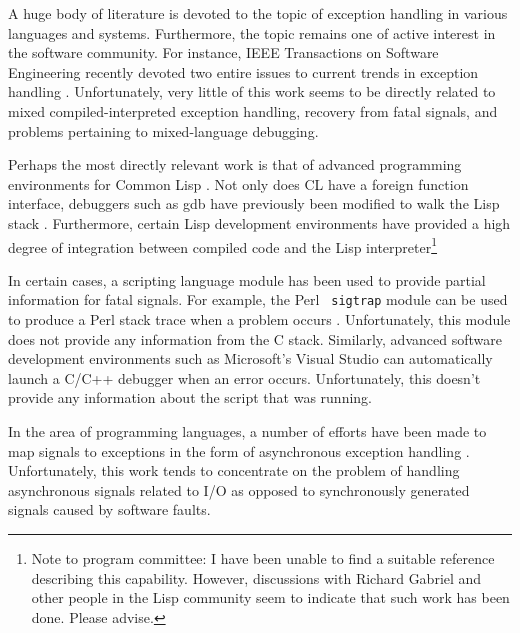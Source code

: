 A huge body of literature is devoted to the topic of exception
handling in various languages and systems.  Furthermore, the topic
remains one of active interest in the software community. For
instance, IEEE Transactions on Software Engineering recently devoted
two entire issues to current trends in exception handling
\cite{except1,except2}.  Unfortunately, very little of this work seems
to be directly related to mixed compiled-interpreted exception
handling, recovery from fatal signals, and problems pertaining to 
mixed-language debugging.

Perhaps the most directly relevant work is that of advanced programming 
environments for Common Lisp \cite{lisp}.  Not only does CL have a foreign function interface,
debuggers such as gdb have previously been modified to walk the Lisp stack
\cite{ffi,wcl}.  Furthermore, certain Lisp development environments have
provided a high degree of integration between compiled code and
the Lisp interpreter\footnote{Note to program committee: I
have been unable to find a suitable reference describing this capability.  However,
discussions with Richard Gabriel and other people in the Lisp community seem to indicate that
such work has been done. Please advise.}

In certain cases, a scripting language module has been used to provide
partial information for fatal signals. For example, the Perl {\tt
sigtrap} module can be used to produce a Perl stack trace when a
problem occurs \cite{perl}.  Unfortunately, this module does not
provide any information from the C stack.   Similarly, advanced software development
environments such as Microsoft's Visual Studio can automatically launch a C/C++ 
debugger when an error occurs.  Unfortunately, this doesn't provide any information
about the script that was running.

In the area of programming languages, a number of efforts have been made to
map signals to exceptions in the form of asynchronous exception handling 
\cite{buhr,ml,haskell}.  Unfortunately, this work tends to 
concentrate on the problem of handling asynchronous signals related to I/O as opposed
to synchronously generated signals caused by software faults.

